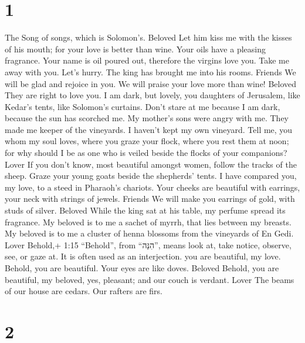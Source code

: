 \hypertarget{section}{%
\section{1}\label{section}}

 The Song of songs, which is Solomon's. Beloved 
Let him kiss me with the kisses of his mouth; for your love is better
than wine.  Your oils have a pleasing fragrance. Your name
is oil poured out, therefore the virgins love you.  Take me
away with you. Let's hurry. The king has brought me into his rooms.
Friends We will be glad and rejoice in you. We will praise your love
more than wine! Beloved They are right to love you.  I am
dark, but lovely, you daughters of Jerusalem, like Kedar's tents, like
Solomon's curtains.  Don't stare at me because I am dark,
because the sun has scorched me. My mother's sons were angry with me.
They made me keeper of the vineyards. I haven't kept my own vineyard.
 Tell me, you whom my soul loves, where you graze your
flock, where you rest them at noon; for why should I be as one who is
veiled beside the flocks of your companions? Lover  If you
don't know, most beautiful amongst women, follow the tracks of the
sheep. Graze your young goats beside the shepherds' tents. 
I have compared you, my love, to a steed in Pharaoh's chariots.
 Your cheeks are beautiful with earrings, your neck with
strings of jewels. Friends  We will make you earrings of
gold, with studs of silver. Beloved  While the king sat at
his table, my perfume spread its fragrance.  My beloved is
to me a sachet of myrrh, that lies between my breasts.  My
beloved is to me a cluster of henna blossoms from the vineyards of En
Gedi. Lover  Behold,+ 1:15 ``Behold'', from ``הִנֵּה'',
means look at, take notice, observe, see, or gaze at. It is often used
as an interjection. you are beautiful, my love. Behold, you are
beautiful. Your eyes are like doves. Beloved  Behold, you
are beautiful, my beloved, yes, pleasant; and our couch is verdant.
Lover  The beams of our house are cedars. Our rafters are
firs.

\hypertarget{section-1}{%
\section{2}\label{section-1}}

